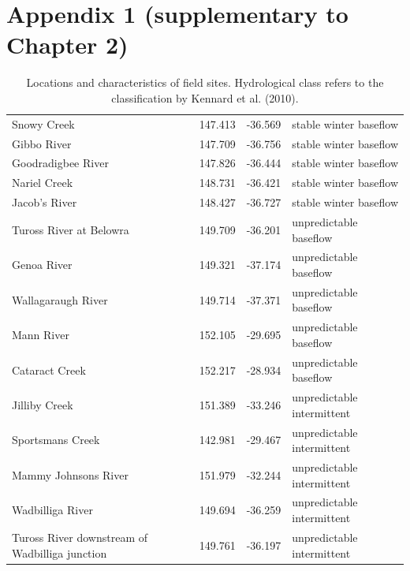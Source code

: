 \chapter[Appendix 1]{Appendix 1 (supplementary to Chapter 2)}

\begin{table}[ht]
\tiny
\centering
\caption[Locations and characteristics of field sites.]{\small{Locations and characteristics of field sites. Hydrological class refers to the classification by Kennard et al. (2010).}}
\label{tab:Ch2sup_T1}
{\tabulinesep=1.2mm
\begin{tabu}to 
\hline
{} &  &  &  \\
\hline
Snowy Creek & 147.413 & -36.569 & stable winter baseflow \\
Gibbo River & 147.709 & -36.756 & stable winter baseflow \\
Goodradigbee River & 147.826 & -36.444 & stable winter baseflow \\
Nariel Creek & 148.731 & -36.421 & stable winter baseflow \\
Jacob’s River & 148.427 & -36.727 & stable winter baseflow \\
Tuross River at Belowra & 149.709 & -36.201 & unpredictable baseflow \\
Genoa River & 149.321 & -37.174 & unpredictable baseflow \\
Wallagaraugh River & 149.714 & -37.371 & unpredictable baseflow \\
Mann River & 152.105 & -29.695 & unpredictable baseflow \\
Cataract Creek & 152.217 & -28.934 & unpredictable baseflow \\
Jilliby Creek & 151.389 & -33.246 & unpredictable intermittent \\
Sportsmans Creek & 142.981 & -29.467 & unpredictable intermittent \\
Mammy Johnsons River & 151.979 & -32.244 & unpredictable intermittent \\
Wadbilliga River & 149.694 & -36.259 & unpredictable intermittent \\
Tuross River downstream of Wadbilliga junction & 149.761 & -36.197 & unpredictable intermittent \\ \hline
\end{tabu}}
\end{table}
\clearpage

